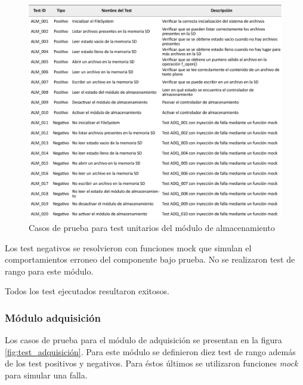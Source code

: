 \begin{figure}[htpb]
	\centering
	\includegraphics[width=\textwidth]{./Figures/TestSD.pdf}
	\caption{Casos de prueba para test unitarios del módulo de almacenamiento}
	\label{fig:test_almacenamiento}
\end{figure}

Los test negativos se resolvieron con funciones mock que simulan el comportamientos erroneo del componente bajo prueba.  No se realizaron test de rango para este módulo.

Todos los test ejecutados resultaron exitosos.

\subsubsection{Módulo adquisición}

Los casos de prueba para el módulo de adquisición se presentan en la figura \ref{fig:test_adquisición}. Para este módulo se definieron diez test de rango además de los test positivos y negativos.  Para éstos últimos se utilizaron funciones \textit{mock} para simular una falla.

